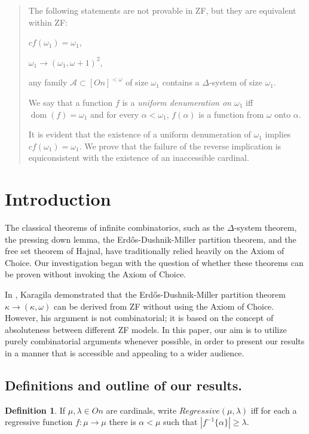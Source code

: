 \documentclass[a4paper,10pt,reqno]{amsart}
\numberwithin{equation}{section}
\theoremstyle{definition}
\newtheorem{definition}[theorem]{Definition}
\theoremstyle{remark}
\newcommand{\mc}[1]{\mathcal{#1}}
\newcommand{\subs}{\subset}
\newcommand{\dom}{\operatorname{dom}}
\begin{document}
\begin{abstract}
The following statements are not provable in ZF, but they are 
equivalent within ZF:
    \begin{inparaenum}[(i)]
     \item $cf({\omega}_1)={\omega}_1$, 
     \item ${\omega}_1\to ({\omega}_1,{\omega}+1)^2$,
     \item  any family $\mc A\subs [{On}]^{<{\omega}}$ of size ${\omega}_1$
     contains a $\Delta$-system of size ${\omega}_1$.
    \end{inparaenum}

We say that a function $f$ is a {\em uniform denumeration on ${\omega}_1$} iff 
$\dom(f)={\omega}_1$ and for every ${\alpha}<{\omega}_1$, $f({\alpha})$ is a function from 
${\omega}$ onto ${\alpha}$.

It is evident that 
the existence of a uniform denumeration of ${\omega}_1$ implies 
$cf({\omega}_1)={\omega}_1$. We prove that the failure of the reverse implication 
is equiconsistent with the existence of an inaccessible cardinal.  

\end{abstract}
\maketitle


 


\section{Introduction}
The classical theorems of infinite combinatorics, such as the $\Delta$-system theorem, the pressing down lemma, the Erdős-Dushnik-Miller partition theorem, and the free set theorem of Hajnal, have traditionally relied heavily on the Axiom of Choice. Our investigation began with the question of whether these theorems can be proven without invoking the Axiom of Choice.

In \cite{Ka14}, Karagila demonstrated that the Erdős-Dushnik-Miller partition theorem ${\kappa}\to ({\kappa},{\omega})$ can be derived from ZF without using the Axiom of Choice. However, his argument is not combinatorial; it is based on the concept of absoluteness between different ZF models. In this paper, our aim is to utilize purely combinatorial arguments whenever possible, in order to present our results in a manner that is accessible and appealing to a wider audience.

\pagebreak
\subsection*{Definitions and outline of our  results.} \nopagebreak 
\begin{definition}
If ${\mu},{\lambda}\in On $ are cardinals,
write $Regressive({\mu},{\lambda})$ iff for 
each a regressive function $f:{\mu}\to {\mu}$  
there is ${\alpha}<{\mu}$ such that 
$|f^{-1}\{{\alpha}\}|\ge {\lambda}$.      
\end{definition}    
\end{document}
